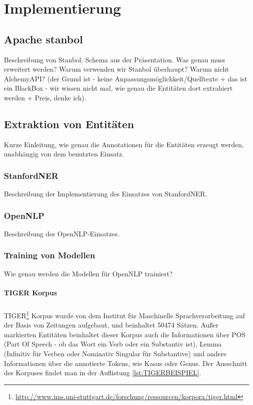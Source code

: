 \chapter{Implementierung}
\label{sec:Implementierung}

\section{Apache stanbol}
Beschreibung von Stanbol. Schema aus der Präsentation. Was genau muss erweitert werden? Warum verwenden wir Stanbol überhaupt? Warum nicht AlchemyAPI? (der Grund ist - keine Anpassungsmöglichkeit/Quelltexte + das ist ein BlackBox - wir wissen nicht mal, wie genau die Entitäten dort extrahiert werden + Preis, denke ich).

\section{Extraktion von Entitäten}
Kurze Einleitung, wie genau die Annotationen für die Entitäten erzeugt werden, unabhängig von dem benutzten Einsatz.

\subsection{StanfordNER} 
Beschreibung der Implementierung des Einsatzes von StanfordNER. 

\subsection{OpenNLP}
Beschreibung des OpenNLP-Einsatzes.

\subsection{Training von Modellen}
Wie genau werden die Modellen für OpenNLP trainiert?

\subsubsection{TIGER Korpus}
\paragraph{}
TIGER\footnote{\url{http://www.ims.uni-stuttgart.de/forschung/ressourcen/korpora/tiger.html}} Korpus wurde von dem Institut für Maschinelle Sprachverarbeitung auf der Basis von Zeitungen aufgebaut, und beinhaltet 50474 Sätzen. Außer markierten Entitäten beinhaltet dieser Korpus auch die Informationen über POS (Part Of Speech - ob das Wort ein Verb oder ein Substantiv ist), Lemma (Infinitiv für Verben oder Nominativ Singular für Substantive) und andere Informationen über die annotierte Tokens, wie Kasus oder Genus. Der Ausschnitt des Korpuses findet man in der Auflistung \ref{lst:TIGERBEISPIEL}.

